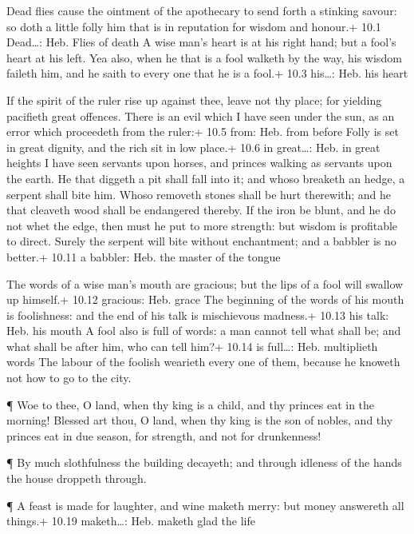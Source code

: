  Dead flies cause the ointment of the apothecary to send
forth a stinking savour: so doth a little folly him that is in
reputation for wisdom and honour.+ 10.1 Dead\ldots: Heb. Flies of death
 A wise man's heart is at his right hand; but a fool's heart
at his left.  Yea also, when he that is a fool walketh by
the way, his wisdom faileth him, and he saith to every one that he is a
fool.+ 10.3 his\ldots: Heb. his heart

 If the spirit of the ruler rise up against thee, leave not
thy place; for yielding pacifieth great offences.  There is
an evil which I have seen under the sun, as an error which proceedeth
from the ruler:+ 10.5 from: Heb. from before  Folly is set
in great dignity, and the rich sit in low place.+ 10.6 in great\ldots:
Heb. in great heights  I have seen servants upon horses, and
princes walking as servants upon the earth.  He that diggeth
a pit shall fall into it; and whoso breaketh an hedge, a serpent shall
bite him.  Whoso removeth stones shall be hurt therewith;
and he that cleaveth wood shall be endangered thereby.  If
the iron be blunt, and he do not whet the edge, then must he put to more
strength: but wisdom is profitable to direct.  Surely the
serpent will bite without enchantment; and a babbler is no better.+
10.11 a babbler: Heb. the master of the tongue

 The words of a wise man's mouth are gracious; but the lips
of a fool will swallow up himself.+ 10.12 gracious: Heb. grace
 The beginning of the words of his mouth is foolishness:
and the end of his talk is mischievous madness.+ 10.13 his talk: Heb.
his mouth  A fool also is full of words: a man cannot tell
what shall be; and what shall be after him, who can tell him?+ 10.14 is
full\ldots: Heb. multiplieth words  The labour of the
foolish wearieth every one of them, because he knoweth not how to go to
the city.

 ¶ Woe to thee, O land, when thy king is a child, and thy
princes eat in the morning!  Blessed art thou, O land, when
thy king is the son of nobles, and thy princes eat in due season, for
strength, and not for drunkenness!

 ¶ By much slothfulness the building decayeth; and through
idleness of the hands the house droppeth through.

 ¶ A feast is made for laughter, and wine maketh merry: but
money answereth all things.+ 10.19 maketh\ldots: Heb. maketh glad the
life

